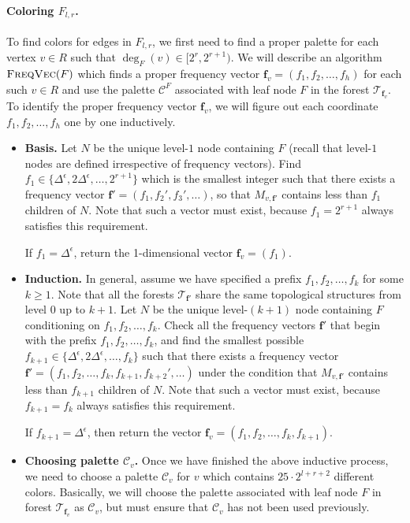 \documentclass[11pt,a4paper]{article}
\newcommand{\tree}{\mathcal{T}}
\newcommand{\freq}{\mathbf{f}}
\newcommand{\clr}{\mathcal{C}}
\begin{document}
\paragraph*{Coloring $F_{l, r}$.} To find colors for edges in $F_{l, r}$, we first need to find a proper palette for each vertex $v\in R$ such that $\deg_F(v)\in [2^r, 2^{r+1})$. We will describe an algorithm $\textsc{FreqVec}(F)$\label{alg:freqvec} which finds a proper frequency vector $\freq_v = (f_1, f_2, \ldots, f_h)$ for each such $v\in R$ and use the palette $\clr^{F}$ associated with leaf node $F$ in the forest $\tree_{\freq_v}$. To identify the proper frequency vector $\freq_v$, we will figure out each coordinate $f_1, f_2, \ldots, f_h$ one by one inductively. 
\begin{itemize}
	\item \textbf{Basis.} Let $N$ be the unique level-$1$ node containing $F$ (recall that level-$1$ nodes are defined irrespective of frequency vectors). Find $f_1 \in \{\Delta^\epsilon, 2\Delta^\epsilon, \ldots, 2^{r+1}\}$ which is the smallest integer such that there exists a frequency vector $\freq' = (f_1, f_2', f_3', \ldots)$, so that $M_{v, \freq'}$ contains less than $f_1$ children of $N$. Note that such a vector must exist, because $f_1 = 2^{r+1}$ always satisfies this requirement.
	
	If $f_1 = \Delta^\epsilon$, return the 1-dimensional vector $\freq_v = (f_1)$.
	
	\item \textbf{Induction.} In general, assume we have specified a prefix $f_1, f_2, \ldots, f_k$ for some $k\geq 1$. Note that all the forests $\tree_{\freq'}$ share the same topological structures from level $0$ up to $k+1$. Let $N$ be the unique level-$(k+1)$ node containing $F$ conditioning on $f_1, f_2, \ldots, f_k$. Check all the frequency vectors $\freq'$ that begin with the prefix $f_1, f_2, \ldots, f_k$, and find the smallest possible $f_{k+1}\in \{\Delta^\epsilon, 2\Delta^\epsilon, \ldots, f_k\}$ such that there exists a frequency vector $\freq' = (f_1, f_2, \ldots, f_k, f_{k+1}, f_{k+2}', \ldots )$ under the condition that $M_{v, \freq'}$ contains less than $f_{k+1}$ children of $N$. Note that such a vector must exist, because $f_{k+1} = f_k$ always satisfies this requirement.
	
	If $f_{k+1} = \Delta^\epsilon$, then return the vector $\freq_v = (f_1, f_2, \ldots, f_k, f_{k+1})$.
	
	\item \textbf{Choosing palette $\clr_v$.} Once we have finished the above inductive process, we need to choose a palette $\clr_v$ for $v$ which contains $25\cdot 2^{l+r+2}$ different colors. Basically, we will choose the palette associated with leaf node $F$ in forest $\tree_{\freq_v}$ as $\clr_v$, but must ensure that $\clr_v$ has not been used previously.
	

\end{itemize}
\end{document}
